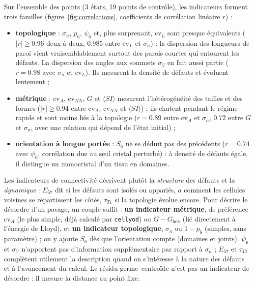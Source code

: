 \documentclass[10pt,a4paper]{article}
\newcommand{\code}[1]{\texttt{#1}}
\begin{document}
Sur l'ensemble des points (3 états, 19 points de contrôle), les indicateurs forment trois familles
(figure~\ref{fig:correlations}, coefficients de corrélation linéaire $r$) :
\begin{itemize}
  \item \textbf{topologique} : $\sigma_n$, $p_6$, $\psi_6$ et, plus surprenant, $\mathrm{cv}_L$ sont presque
    équivalents ($|r|\ge0.96$ deux à deux, $0.985$ entre $\mathrm{cv}_L$ et $\sigma_n$) : la dispersion des
    longueurs de paroi vient vraisemblablement surtout des parois courtes qui entourent les défauts. La
    dispersion des angles aux sommets $\sigma_V$ en fait aussi partie ($r=0.98$ avec $\sigma_n$ et
    $\mathrm{cv}_L$). Ils mesurent la densité de défauts et évoluent lentement ;
  \item \textbf{métrique} : $\mathrm{cv}_A$, $\mathrm{cv}_{NN}$, $G$ et $\langle SI\rangle$ mesurent l'hétérogénéité
    des tailles et des formes ($|r|\ge0.94$ entre $\mathrm{cv}_A$, $\mathrm{cv}_{NN}$ et $\langle SI\rangle$) ; ils
    chutent pendant le régime rapide et sont moins liés à la topologie ($r=0.89$ entre $\mathrm{cv}_A$ et
    $\sigma_n$, $0.72$ entre $G$ et $\sigma_n$, avec une relation qui dépend de l'état initial) ;
  \item \textbf{orientation à longue portée} : $S_6$ ne se déduit pas des précédents ($r=0.74$ avec $\psi_6$,
    corrélation due au seul cristal perturbé) : à densité de défauts égale, il distingue un monocristal d'un
    tissu en domaines.
\end{itemize}
Les indicateurs de connectivité décrivent plutôt la \emph{structure} des défauts et la \emph{dynamique} :
$E_{57}$ dit si les défauts sont isolés ou appariés, $a$ comment les cellules voisines se répartissent les côtés,
$\tau_{T1}$ si la topologie évolue encore.
Pour décrire le désordre d'un pavage, un couple suffit : \textbf{un indicateur métrique}, de préférence
$\mathrm{cv}_A$ (le plus simple, déjà calculé par \code{cellyod}) ou $G-G_{\mathrm{hex}}$ (lié directement à
l'énergie de Lloyd), et \textbf{un indicateur topologique}, $\sigma_n$ ou $1-p_6$ (simples, sans paramètre) ;
on y ajoute $S_6$ dès que l'orientation compte (domaines et joints). $\psi_6$ et $\sigma_V$ n'apportent pas
d'information supplémentaire par rapport à $\sigma_n$ ; $E_{57}$ et $\tau_{T1}$ complètent utilement la
description quand on s'intéresse à la nature des défauts et à l'avancement du calcul.
Le résidu germe--centroïde n'est pas un indicateur de désordre : il mesure la distance au point fixe.
\end{document}
